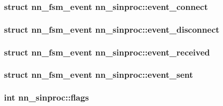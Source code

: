 \subsubsection[{event\+\_\+connect}]{\setlength{\rightskip}{0pt plus 5cm}struct {\bf nn\+\_\+fsm\+\_\+event} nn\+\_\+sinproc\+::event\+\_\+connect}\hypertarget{structnn__sinproc_a57b51461aa38deaff898fe1409c685cb}{}\label{structnn__sinproc_a57b51461aa38deaff898fe1409c685cb}
\subsubsection[{event\+\_\+disconnect}]{\setlength{\rightskip}{0pt plus 5cm}struct {\bf nn\+\_\+fsm\+\_\+event} nn\+\_\+sinproc\+::event\+\_\+disconnect}\hypertarget{structnn__sinproc_ae0549cc1eaf399d76ac2f963c199b0df}{}\label{structnn__sinproc_ae0549cc1eaf399d76ac2f963c199b0df}
\subsubsection[{event\+\_\+received}]{\setlength{\rightskip}{0pt plus 5cm}struct {\bf nn\+\_\+fsm\+\_\+event} nn\+\_\+sinproc\+::event\+\_\+received}\hypertarget{structnn__sinproc_a08ac0565377739a29680295b021fb564}{}\label{structnn__sinproc_a08ac0565377739a29680295b021fb564}
\subsubsection[{event\+\_\+sent}]{\setlength{\rightskip}{0pt plus 5cm}struct {\bf nn\+\_\+fsm\+\_\+event} nn\+\_\+sinproc\+::event\+\_\+sent}\hypertarget{structnn__sinproc_af3b3fc50e4e92fc6184eeb88a3ed0422}{}\label{structnn__sinproc_af3b3fc50e4e92fc6184eeb88a3ed0422}
\subsubsection[{flags}]{\setlength{\rightskip}{0pt plus 5cm}int nn\+\_\+sinproc\+::flags}\hypertarget{structnn__sinproc_a68d3ef16b04178ca01f3951bc0be97f7}{}\label{structnn__sinproc_a68d3ef16b04178ca01f3951bc0be97f7}
